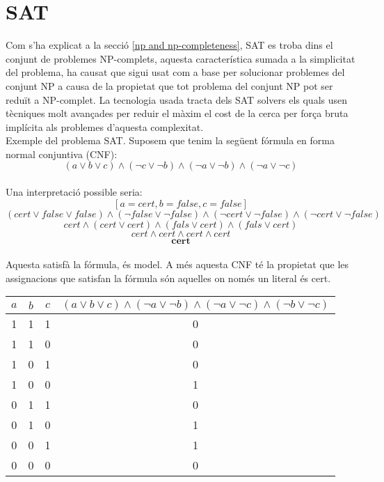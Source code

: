 \section{SAT}
Com s'ha explicat a la secció \ref{np and np-completeness}, SAT es troba dins el conjunt de problemes NP-complets, aquesta característica sumada a la simplicitat del problema, ha causat que sigui usat com a base per solucionar problemes del conjunt NP a causa de la propietat que tot problema del conjunt NP pot ser reduït a NP-complet. La tecnologia usada tracta dels SAT solvers els quals usen tècniques molt avançades per reduir el màxim el cost de la cerca per força bruta implícita als problemes d'aquesta complexitat.\\
Exemple del problema SAT.
Suposem que tenim la següent fórmula en forma normal conjuntiva (CNF):\\
$$(a \lor b \lor c) \land (\lnot c \lor \lnot b) \land (\lnot a \lor \lnot b) \land (\lnot a \lor \lnot c) $$\\
Una interpretació possible seria:\\
$$ [a = cert, b = false, c = false]$$
$$(cert \lor false \lor false) \land (\lnot false \lor \lnot false) \land (\lnot cert \lor \lnot false) \land (\lnot cert \lor \lnot false) $$
$$cert  \land (cert \lor cert) \land (fals \lor cert) \land (fals \lor cert) $$
$$cert \land cert  \land cert \land cert $$
$$\textbf{cert}$$\\
Aquesta satisfà la fórmula, és model. A més aquesta CNF té la propietat que les assignacions que satisfan la fórmula són aquelles on només un literal és cert.\\
\begin{table}
    \centering
    \begin{tabular}{ccc|c}
        $a$ & $b$ & $c$ & $(a \lor b \lor c) \land (\lnot a \lor \lnot b) \land (\lnot a \lor \lnot c) \land (\lnot b \lor \lnot c)$ \\
        \hline
        1 & 1 & 1 & 0 \\
        1 & 1 & 0 & 0 \\
        1 & 0 & 1 & 0 \\
        1 & 0 & 0 & 1 \\
        0 & 1 & 1 & 0 \\
        0 & 1 & 0 & 1 \\
        0 & 0 & 1 & 1 \\
        0 & 0 & 0 & 0 \\
    \end{tabular}
\end{table}


